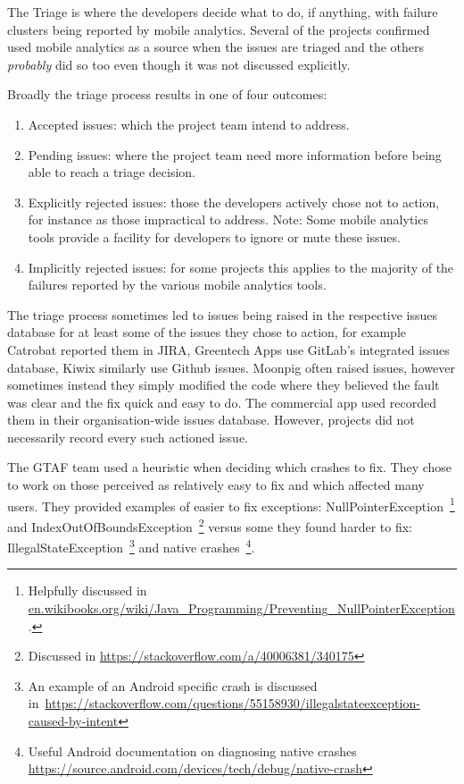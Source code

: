 The Triage is where the developers decide what to do, if anything, with failure clusters being reported by mobile analytics. Several of the projects confirmed used mobile analytics as a source when the issues are triaged and the others \textit{probably} did so too even though it was not discussed explicitly.

Broadly the triage process results in one of four outcomes:
\begin{enumerate}
    \item Accepted issues: which the project team intend to address.
    \item Pending issues: where the project team need more information before being able to reach a triage decision.
    \item Explicitly rejected issues: those the developers actively chose not to action, for instance as those impractical to address. Note: Some mobile analytics tools provide a facility for developers to ignore or mute these issues.
    \item Implicitly rejected issues: for some projects this applies to the majority of the failures reported by the various mobile analytics tools.
\end{enumerate}

The triage process sometimes led to issues being raised in the respective issues database for at least some of the issues they chose to action, for example Catrobat reported them in JIRA, Greentech Apps use GitLab's integrated issues database, Kiwix similarly use Github issues. Moonpig often raised issues, however sometimes instead they simply modified the code where they believed the fault was clear and the fix quick and easy to do. The commercial app used recorded them in their organisation-wide issues database. However, projects did not necessarily record every such actioned issue. 


The GTAF team used a heuristic when deciding which crashes to fix. They chose to work on those perceived as relatively easy to fix and which affected many users. They provided examples of easier to fix exceptions: NullPointerException~\footnote{Helpfully discussed in \href{https://en.wikibooks.org/wiki/Java\_Programming/Preventing\_NullPointerException}{en.wikibooks.org/wiki/Java\_Programming/Preventing\_NullPointerException}.} and IndexOutOfBoundsException~\footnote{Discussed in \url{https://stackoverflow.com/a/40006381/340175}} versus some they found harder to fix: IllegalStateException~\footnote{An example of an Android specific crash is discussed in~\url{https://stackoverflow.com/questions/55158930/illegalstateexception-caused-by-intent}} and native crashes~\footnote{Useful Android documentation on diagnosing native crashes \url{https://source.android.com/devices/tech/debug/native-crash}}.


